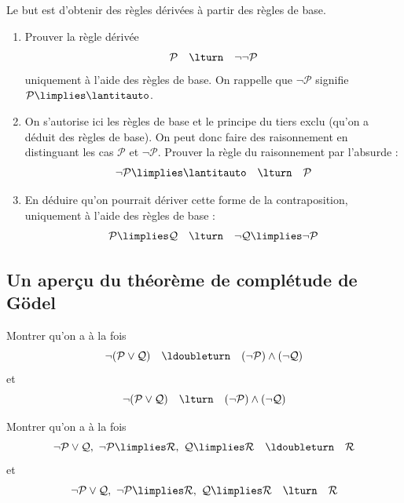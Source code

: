 \documentclass[11pt,class=report,crop=false]{standalone}
\begin{document}
\begin{exercicecours}
	Le but est d'obtenir des règles dérivées à partir des règles de base.
	\begin{enumerate}
		\item Prouver la règle dérivée 
		\[
		\mathcal{P}
		\quad \lturn \quad 
		\lnot \lnot \mathcal{P}\]
		 uniquement à l'aide des règles de base. On rappelle que $\lnot \mathcal{P}$ signifie $\mathcal{P} \limplies \lantitauto$.
		
		\item On s'autorise ici les règles de base et le principe du tiers exclu (qu'on a déduit des règles de base). On peut donc faire des raisonnement en distinguant les cas $\mathcal{P}$ et $\lnot \mathcal{P}$. Prouver la règle du raisonnement par l'absurde : 
		\[ 
		\lnot \mathcal{P} \limplies \lantitauto
		\quad \lturn \quad 
		\mathcal{P}
		\]		
		 
		\item En déduire qu'on pourrait dériver cette forme de la contraposition, uniquement à l'aide des règles de base :
		\[
		\mathcal{P} \limplies \mathcal{Q}
		\quad \lturn \quad 
		\lnot \mathcal{Q} \limplies \lnot \mathcal{P}
		\]
	\end{enumerate}
	
	
\end{exercicecours}





\subsection*{Un aperçu du théorème de complétude de Gödel}

\begin{exercicecours}
	Montrer qu'on a à la fois 
	\[
	\lnot (\mathcal{P} \lor \mathcal{Q}) 
	\quad \ldoubleturn \quad 
	(\lnot \mathcal{P}) \land (\lnot \mathcal{Q})
	\]
	et
	\[
	\lnot (\mathcal{P} \lor \mathcal{Q}) 
	\quad \lturn \quad 
	(\lnot \mathcal{P}) \land (\lnot \mathcal{Q})
	\]	
\end{exercicecours}


\begin{exercicecours}
	Montrer qu'on a à la fois 
\[
\lnot \mathcal{P} \lor \mathcal{Q}, 
\ \lnot \mathcal{P} \limplies \mathcal{R}, 
\ \mathcal{Q} \limplies \mathcal{R}
\quad \ldoubleturn \quad 
\mathcal{R}
\]
et
\[
\lnot \mathcal{P} \lor \mathcal{Q}, 
\ \lnot \mathcal{P} \limplies \mathcal{R}, 
\ \mathcal{Q} \limplies \mathcal{R}
\quad \lturn \quad 
\mathcal{R}
\]		
	
\end{exercicecours}
\end{document}
